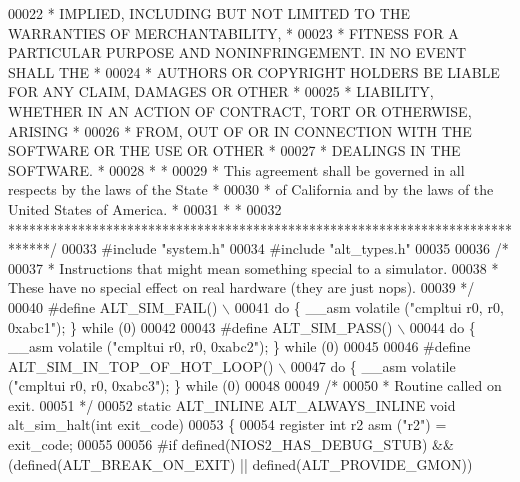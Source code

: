 \begin{DoxyCode}
00022 \textcolor{comment}{* IMPLIED, INCLUDING BUT NOT LIMITED TO THE WARRANTIES OF MERCHANTABILITY,    *}
00023 \textcolor{comment}{* FITNESS FOR A PARTICULAR PURPOSE AND NONINFRINGEMENT. IN NO EVENT SHALL THE *}
00024 \textcolor{comment}{* AUTHORS OR COPYRIGHT HOLDERS BE LIABLE FOR ANY CLAIM, DAMAGES OR OTHER      *}
00025 \textcolor{comment}{* LIABILITY, WHETHER IN AN ACTION OF CONTRACT, TORT OR OTHERWISE, ARISING     *}
00026 \textcolor{comment}{* FROM, OUT OF OR IN CONNECTION WITH THE SOFTWARE OR THE USE OR OTHER         *}
00027 \textcolor{comment}{* DEALINGS IN THE SOFTWARE.                                                   *}
00028 \textcolor{comment}{*                                                                             *}
00029 \textcolor{comment}{* This agreement shall be governed in all respects by the laws of the State   *}
00030 \textcolor{comment}{* of California and by the laws of the United States of America.              *}
00031 \textcolor{comment}{*                                                                             *}
00032 \textcolor{comment}{******************************************************************************/}
00033 \textcolor{preprocessor}{#include "system.h"}
00034 \textcolor{preprocessor}{#include "alt_types.h"}
00035 
00036 \textcolor{comment}{/* }
00037 \textcolor{comment}{ * Instructions that might mean something special to a simulator. }
00038 \textcolor{comment}{ * These have no special effect on real hardware (they are just nops).}
00039 \textcolor{comment}{ */}
00040 \textcolor{preprocessor}{#define ALT\_SIM\_FAIL() \(\backslash\)}
00041 \textcolor{preprocessor}{    do \{ \_\_asm volatile ("cmpltui r0, r0, 0xabc1"); \} while (0)}
00042 
00043 \textcolor{preprocessor}{#define ALT\_SIM\_PASS() \(\backslash\)}
00044 \textcolor{preprocessor}{    do \{ \_\_asm volatile ("cmpltui r0, r0, 0xabc2"); \} while (0)}
00045 
00046 \textcolor{preprocessor}{#define ALT\_SIM\_IN\_TOP\_OF\_HOT\_LOOP() \(\backslash\)}
00047 \textcolor{preprocessor}{    do \{ \_\_asm volatile ("cmpltui r0, r0, 0xabc3"); \} while (0)}
00048 
00049 \textcolor{comment}{/*}
00050 \textcolor{comment}{ * Routine called on exit.}
00051 \textcolor{comment}{ */}
00052 \textcolor{keyword}{static} ALT_INLINE ALT_ALWAYS_INLINE \textcolor{keywordtype}{void} alt_sim_halt(\textcolor{keywordtype}{int} exit\_code)
00053 \{
00054   \textcolor{keyword}{register} \textcolor{keywordtype}{int} r2 \textcolor{keyword}{asm} (\textcolor{stringliteral}{"r2"}) = exit\_code;
00055 
00056 \textcolor{preprocessor}{#if defined(NIOS2\_HAS\_DEBUG\_STUB) && (defined(ALT\_BREAK\_ON\_EXIT) || defined(ALT\_PROVIDE\_GMON))}

\end{DoxyCode}

